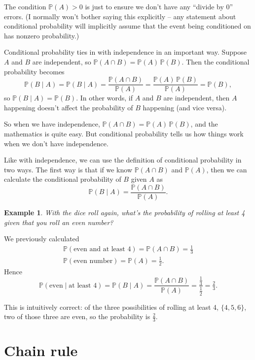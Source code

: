 \documentclass[
  a4paper,
]{book}
\theoremstyle{definition}
\theoremstyle{definition}
\newtheorem{example}{Example}[chapter]
\theoremstyle{definition}
\theoremstyle{definition}
\theoremstyle{remark}
\begin{document}
The condition \(\mathbb P(A) > 0\) is just to ensure we don't have any ``divide by 0'' errors. (I normally won't bother saying this explicitly -- any statement about conditional probability will implicitly assume that the event being conditioned on has nonzero probability.)

Conditional probability ties in with independence in an important way. Suppose \(A\) and \(B\) are independent, so \(\mathbb P(A \cap B) = \mathbb P(A) \, \mathbb P(B)\). Then the conditional probability becomes
\[ \mathbb P(B \mid A) = \mathbb P(B \mid A) = \frac{\mathbb P(A \cap B)}{\mathbb P(A)} =  \frac{\mathbb P(A) \, \mathbb P(B)}{\mathbb P(A)} = \mathbb P(B) , \]
so \(\mathbb P(B \mid A) = \mathbb P(B)\). In other words, if \(A\) and \(B\) are independent, then \(A\) happening doesn't affect the probability of \(B\) happening (and vice versa).

So when we have independence, \(\mathbb P(A \cap B) = \mathbb P(A)\,\mathbb P(B)\), and the mathematics is quite easy. But conditional probability tells us how things work when we don't have independence.

Like with independence, we can use the definition of conditional probability in two ways. The first way is that if we know \(\mathbb P(A \cap B)\) and \(\mathbb P(A)\), then we can calculate the conditional probability of \(B\) given \(A\) as
\[  \mathbb P(B \mid A) = \frac{\mathbb P(A \cap B)}{\mathbb P(A)} . \]

\begin{example}
\emph{With the dice roll again, what's the probability of rolling at least 4 given that you roll an even number?}

We previously calculated
\begin{gather*}
\mathbb P(\text{even and at least 4}) = \mathbb P(A \cap B) = \tfrac{1}{3} \\
\mathbb P(\text{even number}) = \mathbb P(A) = \tfrac{1}{2} .
\end{gather*}
Hence
\[ \mathbb P(\text{even} \mid \text{at least 4}) = \mathbb P(B \mid A) = \frac{\mathbb P(A \cap B)}{\mathbb P(A)} = \frac{\frac13}{\frac12} = \tfrac23 . \]

This is intuitively correct: of the three possibilities of rolling at least 4, \(\{4,5,6\}\), two of those three are even, so the probability is \(\frac23\).
\end{example}

\hypertarget{chain-rule}{%
\section{Chain rule}\label{chain-rule}}
\end{document}
